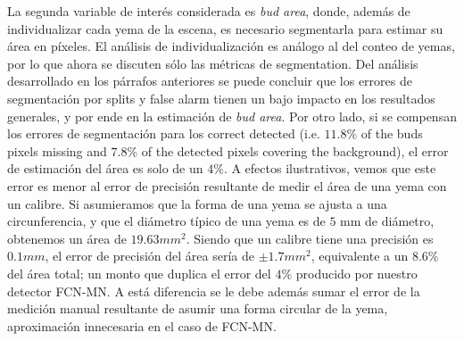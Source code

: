 \documentclass[a4paper,authoryear,review]{elsarticle}
\begin{document}
%
La segunda variable de interés considerada es \emph{bud area}, donde, además de individualizar cada yema de la escena, es necesario segmentarla para estimar su área en píxeles. El análisis de individualización es análogo al del conteo de yemas, por lo que ahora se discuten sólo las métricas de segmentation. Del análisis desarrollado en los párrafos anteriores se puede concluir que los errores de segmentación por splits y false alarm tienen un bajo impacto en los resultados generales, y por ende en la estimación de \emph{bud area}. Por otro lado, si se compensan los errores de segmentación para los correct detected (i.e. $11.8\%$ of the buds pixels missing and $7.8\%$ of the detected pixels covering the background), el error de estimación del área es solo de un $4\%$. A efectos ilustrativos, vemos que este error es menor al error de precisión resultante de medir el área de una yema con un calibre. Si asumieramos que la forma de una yema se ajusta a una circunferencia, y que el diámetro típico de una yema es de $5$ mm de diámetro, obtenemos un área de $19.63 mm^2$. Siendo que un calibre tiene una precisión es $0.1 mm$, el error de precisión del área sería de $\pm 1.7 mm^2$, equivalente a un $8.6\%$ del área total; un monto que duplica el error del $4\%$ producido por nuestro detector FCN-MN. A está diferencia se le debe además sumar el error de la medición manual resultante de asumir una forma circular de la yema, aproximación innecesaria en el caso de FCN-MN.
%
\end{document}

